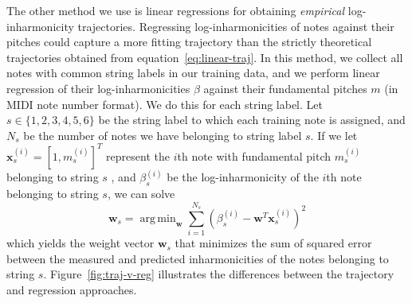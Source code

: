 \documentclass[12pt]{cmuthesis}
\DeclareMathOperator*{\argmin}{arg\,min}
\begin{document}
The other method we use is linear regressions for obtaining \textit{empirical} log-inharmonicity trajectories. Regressing log-inharmonicities of notes against their pitches could capture a more fitting trajectory than the strictly theoretical trajectories obtained from equation~\eqref{eq:linear-traj}. In this method, we collect all notes with common string labels in our training data, and we perform linear regression of their log-inharmonicities $\beta$ against their fundamental pitches $m$ (in MIDI note number format). We do this for each string label. Let $s \in \{1,2,3,4,5,6\}$ be the string label to which each training note is assigned, and $N_s$ be the number of notes we have belonging to string label $s$. If we let $\mathbf{x}_s^{(i)} = [1, m_s^{(i)}]^T$ represent the $i$th note with fundamental pitch $m^{(i)}_s$ belonging to string $s$ , and $\beta_s^{(i)}$ be the log-inharmonicity of the $i$th note belonging to string $s$, we can solve
\begin{equation}
\label{lin-reg}
\mathbf{w}_s = \argmin_{\mathbf{w}}{\sum_{i=1}^{N_s}{(\beta^{(i)}_s - \mathbf{w}^T\mathbf{x}^{(i)}_s)^2}}
\end{equation}
which yields the weight vector $\mathbf{w}_s$ that minimizes the sum of squared error between the measured and predicted inharmonicities of the notes belonging to string $s$. Figure~\ref{fig:traj-v-reg} illustrates the differences between the trajectory and regression approaches.
\end{document}
